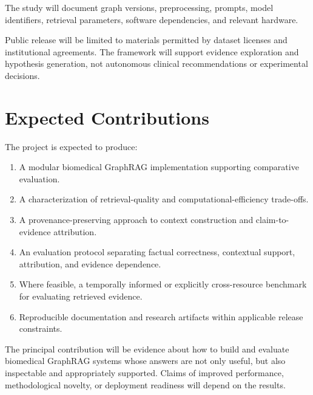 The study will document graph versions, preprocessing, prompts, model identifiers, retrieval parameters, software dependencies, and relevant hardware.

Public release will be limited to materials permitted by dataset licenses and institutional agreements. The framework will support evidence exploration and hypothesis generation, not autonomous clinical recommendations or experimental decisions.


\section{Expected Contributions}\label{expected-contributions}

The project is expected to produce:

\begin{enumerate}
\def\labelenumi{\arabic{enumi}.}
\tightlist
\item
  A modular biomedical GraphRAG implementation supporting comparative evaluation.
\item
  A characterization of retrieval-quality and computational-efficiency trade-offs.
\item
  A provenance-preserving approach to context construction and claim-to-evidence attribution.
\item
  An evaluation protocol separating factual correctness, contextual support, attribution, and evidence dependence.
\item
  Where feasible, a temporally informed or explicitly cross-resource benchmark for evaluating retrieved evidence.
\item
  Reproducible documentation and research artifacts within applicable release constraints.
\end{enumerate}

The principal contribution will be evidence about how to build and evaluate biomedical GraphRAG systems whose answers are not only useful, but also inspectable and appropriately supported. Claims of improved performance, methodological novelty, or deployment readiness will depend on the results.
